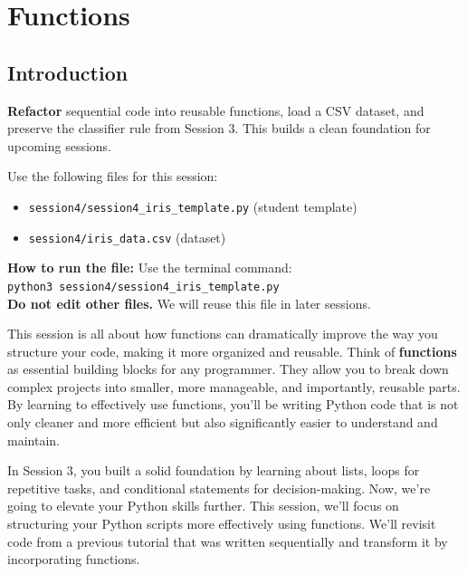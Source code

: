 \chapter{Functions}

\section{Introduction}

\begin{tcolorbox}[title=Goal]
\textbf{Refactor} sequential code into reusable functions, load a CSV dataset, and preserve the classifier rule from Session 3. This builds a clean foundation for upcoming sessions.
\end{tcolorbox}

\begin{tcolorbox}[title=You will work in]
Use the following files for this session:
\begin{itemize}
    \item \texttt{session4/session4\_iris\_template.py} (student template)
    \item \texttt{session4/iris\_data.csv} (dataset)
\end{itemize}
\textbf{How to run the file:} Use the terminal command: \\
\texttt{python3 session4/session4\_iris\_template.py} \\
\textbf{Do not edit other files.} We will reuse this file in later sessions.
\end{tcolorbox}

This session is all about how functions can dramatically improve the way you structure your code, making it more organized and reusable. Think of \textbf{functions} as essential building blocks for any programmer. They allow you to break down complex projects into smaller, more manageable, and importantly, reusable parts. By learning to effectively use functions, you'll be writing Python code that is not only cleaner and more efficient but also significantly easier to understand and maintain.

In Session 3, you built a solid foundation by learning about lists, loops for repetitive tasks, and conditional statements for decision-making. Now, we're going to elevate your Python skills further. This session, we'll focus on structuring your Python scripts more effectively using functions. We'll revisit code from a previous tutorial that was written sequentially and transform it by incorporating functions.

